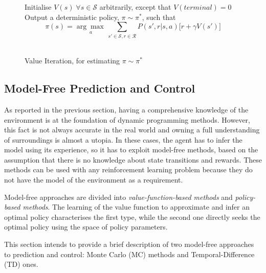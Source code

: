 \begin{figure}

\begin{algorithm}[H]
	\SetAlgoLined
	\DontPrintSemicolon
	\LinesNumbered
	Initialise $V(s) \; \forall s \in \mathcal{S}$ arbitrarily, except that $V(terminal) = 0$\;
		Output a deterministic policy, $\pi \sim \pi^*$, such that \[
		\pi(s) = \underset{a}{\arg\max\,} \sum_{s' \in \mathcal{S}, r \in \mathcal{R}} P(s', r|s,a) \big[r+\gamma V(s')\big]\]\\
	\caption{Value Iteration, for estimating $\pi \sim \pi^*$}
	\label{value_iteration}
\end{algorithm}

\end{figure}

\subsection{Model-Free Prediction and Control}

As reported in the previous section, having a comprehensive knowledge of the environment is at the foundation of dynamic programming methods. However, this fact is not always accurate in the real world and owning a full understanding of surroundings is almost a utopia.
In these cases, the agent has to infer the model using its experience, so it has to exploit model-free methods, based on the assumption that there is no knowledge about state transitions and rewards.
These methods can be used with any reinforcement learning problem because they do not have the model of the environment as a requirement.

Model-free approaches are divided into \textit{value-function-based methods} and \textit{policy-based methods}. 
The learning of the value function to approximate and infer an optimal policy characterises the first type, while the second one directly seeks the optimal policy using the space of policy parameters.

This section intends to provide a brief description of two model-free approaches to prediction and control: Monte Carlo (MC) methods and Temporal-Difference (TD) ones.

